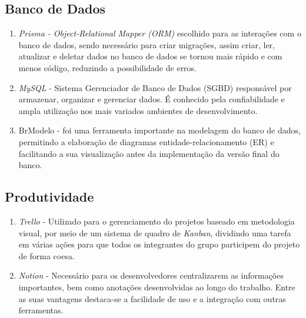 \subsection{Banco de Dados}

\begin{enumerate}

	\item \textit{Prisma - Object-Relational Mapper (ORM)} escolhido para as interações com o banco de dados, sendo necessário para criar migrações, assim criar, ler, atualizar e deletar dados no banco de dados se tornou mais rápido e com menos código, reduzindo a possibilidade de erros.
	
	\item \textit{MySQL} - Sistema Gerenciador de Banco de Dados (SGBD) responsável por armazenar, organizar e gerenciar dados. É conhecido pela confiabilidade e ampla utilização nos mais variados ambientes de desenvolvimento.
	
	\item BrModelo -  foi uma ferramenta importante na modelagem do banco de dados, permitindo a elaboração de diagramas entidade-relacionamento (ER) e facilitando a sua visualização antes da implementação da versão final do banco.
	
\end{enumerate}

\subsection{Produtividade}

\begin{enumerate}
	
	\item \textit{Trello} - Utilizado para o gerenciamento do projetos baseado em metodologia visual, por meio de um sistema de quadro de \textit{Kanban}, dividindo uma tarefa em várias ações para que todos os integrantes do grupo participem do projeto de forma coesa.
	
	\item \textit{Notion} -  Necessário para os desenvolvedores centralizarem as informações importantes, bem como anotações desenvolvidas ao longo do trabalho. Entre as suas vantagens destaca-se a facilidade de uso e a integração com outras ferramentas.
	
\end{enumerate}

